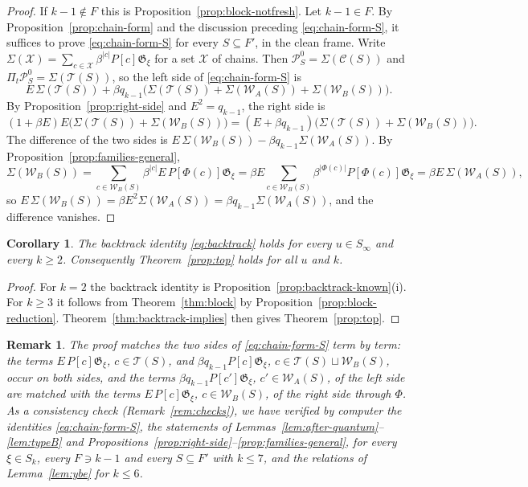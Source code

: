 \documentclass[11pt]{article}
\newtheorem{corollary}[proposition]{Corollary}
\newtheorem{remark}[proposition]{Remark}
\newcommand{\G}{\mathfrak{G}}
\begin{document}
\begin{proof}
If $k-1\notin F$ this is Proposition~\ref{prop:block-notfresh}. Let
$k-1\in F$. By Proposition~\ref{prop:chain-form} and the discussion
preceding \eqref{eq:chain-form-S}, it suffices to prove
\eqref{eq:chain-form-S} for every $S\subseteq F'$, in the clean frame.
Write $\Sigma(\mathcal X)=\sum_{c\in\mathcal X}\beta^{|c|}P[c]\G_\xi$
for a set $\mathcal X$ of chains. Then
$\mathcal P^0_S=\Sigma(\mathcal C(S))$ and
$\Pi_t\mathcal P^0_S=\Sigma(\mathcal T(S))$, so the left side of
\eqref{eq:chain-form-S} is
\[
 E\,\Sigma(\mathcal T(S))+\beta q_{k-1}\bigl(\Sigma(\mathcal T(S))+\Sigma(\mathcal W_A(S))+\Sigma(\mathcal W_B(S))\bigr).
\]
By Proposition~\ref{prop:right-side} and $E^2=q_{k-1}$, the right side
is
\[
 (1+\beta E)E\bigl(\Sigma(\mathcal T(S))+\Sigma(\mathcal W_B(S))\bigr)
 =(E+\beta q_{k-1})\bigl(\Sigma(\mathcal T(S))+\Sigma(\mathcal W_B(S))\bigr).
\]
The difference of the two sides is
$E\,\Sigma(\mathcal W_B(S))-\beta q_{k-1}\Sigma(\mathcal W_A(S))$. By
Proposition~\ref{prop:families-general},
\[
 \Sigma(\mathcal W_B(S))=\sum_{c\in\mathcal W_B(S)}\beta^{|c|}E\,P[\Phi(c)]\G_\xi
 =\beta E\sum_{c\in\mathcal W_B(S)}\beta^{|\Phi(c)|}P[\Phi(c)]\G_\xi
 =\beta E\,\Sigma(\mathcal W_A(S)),
\]
so $E\,\Sigma(\mathcal W_B(S))=\beta E^2\Sigma(\mathcal W_A(S))=\beta q_{k-1}\Sigma(\mathcal W_A(S))$,
and the difference vanishes.
\end{proof}

\begin{corollary}\label{cor:main}
The backtrack identity \eqref{eq:backtrack} holds for every
$u\in S_\infty$ and every $k\geq2$. Consequently
Theorem~\ref{prop:top} holds for all $u$ and $k$.
\end{corollary}

\begin{proof}
For $k=2$ the backtrack identity is
Proposition~\ref{prop:backtrack-known}(i). For $k\geq3$ it follows
from Theorem~\ref{thm:block} by Proposition~\ref{prop:block-reduction}.
Theorem~\ref{thm:backtrack-implies} then gives Theorem~\ref{prop:top}.
\end{proof}

\begin{remark}
The proof matches the two sides of \eqref{eq:chain-form-S} term by
term: the terms $E\,P[c]\G_\xi$, $c\in\mathcal T(S)$, and
$\beta q_{k-1}P[c]\G_\xi$, $c\in\mathcal T(S)\sqcup\mathcal W_B(S)$,
occur on both sides, and the terms $\beta q_{k-1}P[c']\G_\xi$,
$c'\in\mathcal W_A(S)$, of the left side are matched with the terms
$E\,P[c]\G_\xi$, $c\in\mathcal W_B(S)$, of the right side through
$\Phi$. As a consistency check (Remark~\ref{rem:checks}), we have
verified by computer the identities \eqref{eq:chain-form-S}, the
statements of Lemmas~\ref{lem:after-quantum}--\ref{lem:typeB} and
Propositions~\ref{prop:right-side}--\ref{prop:families-general}, for
every $\xi\in S_k$, every $F\ni k-1$ and every $S\subseteq F'$ with
$k\leq7$, and the relations of Lemma~\ref{lem:ybe} for $k\leq6$.
\end{remark}
\end{document}
